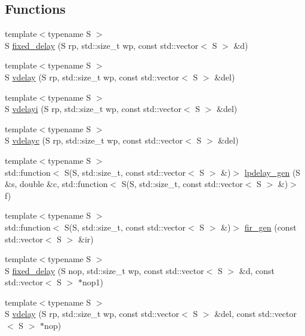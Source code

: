 \subsection*{Functions}
\begin{DoxyCompactItemize}
\item 
{\footnotesize template$<$typename S $>$ }\\S \hyperlink{namespace_aurora_a62442f237e70fdaac1efc22b4e82e875}{fixed\+\_\+delay} (S rp, std\+::size\+\_\+t wp, const std\+::vector$<$ S $>$ \&d)
\item 
{\footnotesize template$<$typename S $>$ }\\S \hyperlink{namespace_aurora_ab93392950e0b9ae8fbbccf7cc1b55a13}{vdelay} (S rp, std\+::size\+\_\+t wp, const std\+::vector$<$ S $>$ \&del)
\item 
{\footnotesize template$<$typename S $>$ }\\S \hyperlink{namespace_aurora_a5318ddb492590ada5dc40ba80bbf655b}{vdelayi} (S rp, std\+::size\+\_\+t wp, const std\+::vector$<$ S $>$ \&del)
\item 
{\footnotesize template$<$typename S $>$ }\\S \hyperlink{namespace_aurora_ac522d6f69ef7018efa8ac07fd26ad057}{vdelayc} (S rp, std\+::size\+\_\+t wp, const std\+::vector$<$ S $>$ \&del)
\item 
{\footnotesize template$<$typename S $>$ }\\std\+::function$<$ S(S, std\+::size\+\_\+t, const std\+::vector$<$ S $>$ \&)$>$ \hyperlink{namespace_aurora_a8a142312f627aaa19ba0e8a87f33d00b}{lpdelay\+\_\+gen} (S \&s, double \&c, std\+::function$<$ S(S, std\+::size\+\_\+t, const std\+::vector$<$ S $>$ \&)$>$ f)
\item 
{\footnotesize template$<$typename S $>$ }\\std\+::function$<$ S(S, std\+::size\+\_\+t, const std\+::vector$<$ S $>$ \&)$>$ \hyperlink{namespace_aurora_abf3b452f54db43f366b261c3702b0c0b}{fir\+\_\+gen} (const std\+::vector$<$ S $>$ \&ir)
\item 
{\footnotesize template$<$typename S $>$ }\\S \hyperlink{namespace_aurora_ad2d492fbf6dc9b468619e2403ace6e25}{fixed\+\_\+delay} (S nop, std\+::size\+\_\+t wp, const std\+::vector$<$ S $>$ \&d, const std\+::vector$<$ S $>$ $\ast$nop1)
\item 
{\footnotesize template$<$typename S $>$ }\\S \hyperlink{namespace_aurora_addae9c1b83fcfd6ee11bbbe5a4d3d329}{vdelay} (S rp, std\+::size\+\_\+t wp, const std\+::vector$<$ S $>$ \&del, const std\+::vector$<$ S $>$ $\ast$nop)

\end{DoxyCompactItemize}
